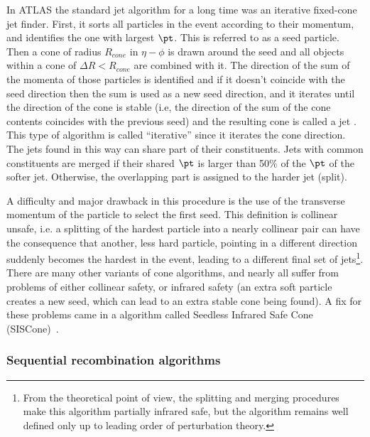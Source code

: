 In ATLAS the standard jet algorithm  for a long time was an iterative fixed-cone jet finder. 
First, it sorts all particles in the event according to their momentum, and identifies the one with largest $\pt$.  This is referred to as a seed particle.  Then a cone of radius $R_{cone}$ in  $\eta - \phi$ is drawn around the seed and all objects within a cone of $\Delta R < R_{cone}$ are combined with it. The direction of the sum of the momenta of those particles is identified and if it doesn't coincide with the seed direction then the sum is used as a new seed direction, and it iterates until the direction of the cone is stable (i.e, the direction of the sum of the cone contents coincides with the previous seed) and the resulting cone is called a jet . This type of algorithm is called  ``iterative'' since it iterates the cone direction. The jets found in this way can share part of their constituents. Jets with common constituents are merged if their shared $\pt$ is larger than 50\% of the $\pt$ of the softer jet.  Otherwise, the overlapping part is assigned to the harder jet (split).

A difficulty and major drawback in this procedure is the use of the transverse momentum of the particle to select the first seed. This definition is collinear unsafe, i.e. a splitting of the hardest particle into a nearly collinear pair can have the consequence that another, less hard particle, pointing in a different direction suddenly becomes the hardest in the event, leading to a different final set of jets\footnote{From the theoretical point of view, the splitting and merging procedures make this algorithm partially infrared safe, but the algorithm remains well defined only up to leading order of perturbation theory.}. There are many other variants of cone algorithms, and nearly all suffer from problems of either collinear safety, or infrared safety (an extra soft particle creates a new seed, which can lead to an extra stable cone being found). A fix for these problems came in a algorithm called Seedless Infrared Safe Cone (SISCone)~\cite{SISCone}.


\subsubsection{Sequential recombination algorithms}

